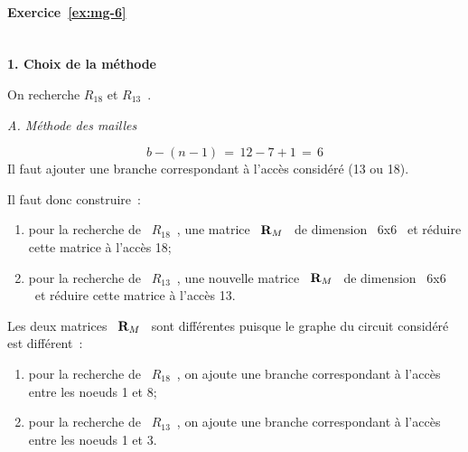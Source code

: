\paragraph{Exercice~\ref{ex:mg-6}}~\\%
{\bf 1. Choix de la méthode} \ 

On recherche  $R_{18}$ et $R_{13}$~.

{\em A. Méthode des mailles}

\[ b-(n-1) \, = \, 12-7+1 \, = \, 6 \]
Il faut ajouter une branche correspondant à l'accès considéré (13 ou 18).

Il faut donc construire~:
\begin{enumerate}
	\item pour la recherche de \ $R_{18}$~, une matrice \ ${\bf R}_M$ \ de
	dimension \ $6$x$6$ \ et réduire cette matrice à l'accès 18;
	\item pour la recherche de \ $R_{13}$~, une nouvelle matrice \ ${\bf
		R}_M$ \ de dimension \ $6$x$6$ \ et réduire cette matrice à l'accès
	13.
\end{enumerate}

Les deux matrices \ ${\bf R}_M$ \ sont différentes puisque le graphe
du circuit considéré est différent~:
\begin{enumerate}
	\item pour la recherche de \ $R_{18}$~, on ajoute une branche
	correspondant à l'accès entre les noeuds 1 et 8;
	\item pour la recherche de \ $R_{13}$~, on ajoute une branche
	correspondant à l'accès entre les noeuds 1 et 3.
\end{enumerate}

